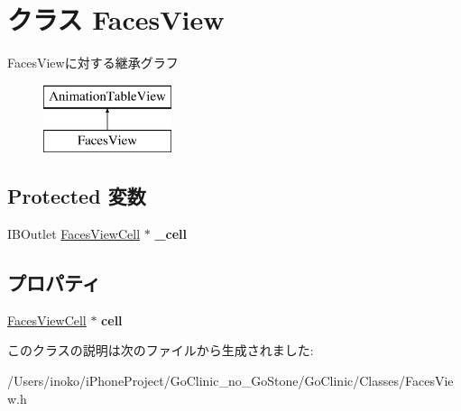 \hypertarget{interface_faces_view}{
\section{クラス FacesView}
\label{interface_faces_view}
}
FacesViewに対する継承グラフ\begin{figure}[H]
\begin{center}
\leavevmode
\includegraphics[height=2.000000cm]{interface_faces_view}
\end{center}
\end{figure}
\subsection*{Protected 変数}
\begin{DoxyCompactItemize}
\item 
\hypertarget{interface_faces_view_af2b84e2dad6c4ef7948a084341cad99e}{
IBOutlet \hyperlink{interface_faces_view_cell}{FacesViewCell} $\ast$ {\bfseries \_\-cell}}
\label{interface_faces_view_af2b84e2dad6c4ef7948a084341cad99e}

\end{DoxyCompactItemize}
\subsection*{プロパティ}
\begin{DoxyCompactItemize}
\item 
\hypertarget{interface_faces_view_a99afdd777d04877b3556c2fc809dd612}{
\hyperlink{interface_faces_view_cell}{FacesViewCell} $\ast$ {\bfseries cell}}
\label{interface_faces_view_a99afdd777d04877b3556c2fc809dd612}

\end{DoxyCompactItemize}


このクラスの説明は次のファイルから生成されました:\begin{DoxyCompactItemize}
\item 
/Users/inoko/iPhoneProject/GoClinic\_\-no\_\-GoStone/GoClinic/Classes/FacesView.h\end{DoxyCompactItemize}
